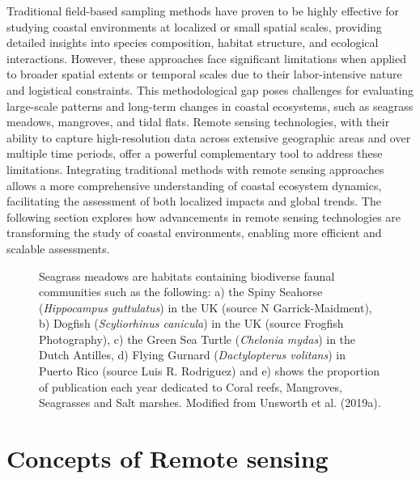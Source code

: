 \documentclass[
  letterpaper,
  11pt,
  english,
  singlespacing,
  headsepline]{MastersDoctoralThesis}
\begin{document}
\begin{spacing}{1.5}
\begin{tcolorbox}
Traditional field-based sampling methods have proven to be highly effective for studying coastal environments at localized or small spatial scales, providing detailed insights into species composition, habitat structure, and ecological interactions. However, these approaches face significant limitations when applied to broader spatial extents or temporal scales due to their labor-intensive nature and logistical constraints. This methodological gap poses challenges for evaluating large-scale patterns and long-term changes in coastal ecosystems, such as seagrass meadows, mangroves, and tidal flats. Remote sensing technologies, with their ability to capture high-resolution data across extensive geographic areas and over multiple time periods, offer a powerful complementary tool to address these limitations. Integrating traditional methods with remote sensing approaches allows a more comprehensive understanding of coastal ecosystem dynamics, facilitating the assessment of both localized impacts and global trends. The following section explores how advancements in remote sensing technologies are transforming the study of coastal environments, enabling more efficient and scalable assessments.
\end{tcolorbox}

\begin{figure}


\caption{\label{fig-SeagrassHabitat}Seagrass meadows are habitats
containing biodiverse faunal communities such as the following: a) the
Spiny Seahorse (\emph{Hippocampus guttulatus}) in the UK (source N
Garrick-Maidment), b) Dogfish (\emph{Scyliorhinus canicula}) in the UK
(source Frogfish Photography), c) the Green Sea Turtle (\emph{Chelonia
mydas}) in the Dutch Antilles, d) Flying Gurnard (\emph{Dactylopterus
volitans}) in Puerto Rico (source Luis R. Rodriguez) and e) shows the
proportion of publication each year dedicated to Coral reefs, Mangroves,
Seagrasses and Salt marshes. Modified from Unsworth et al. (2019a).}

\end{figure}%

\section{Concepts of Remote sensing}\label{concepts-of-remote-sensing}


\end{spacing}
\end{document}
